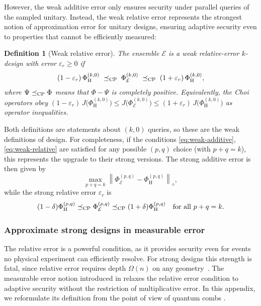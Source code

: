 \documentclass[
    aps,
    superscriptaddress,
    onecolumn,
    10pt,
    prx,
    nofootinbib
]{revtex4-2}
\newtheorem{definition}{Definition}
\newcommand{\Haar}{\mathrm H}
\newcommand{\cE}{\mathcal E}
\theoremstyle{namedstatement}
\theoremstyle{plain}
\begin{document}
However, the weak additive error only ensures security under parallel queries of the sampled unitary. Instead, the weak relative error represents the strongest notion of approximation error for unitary designs, ensuring adaptive security even to properties that cannot be efficiently measured:
 
\begin{definition}[Weak relative error]\label{def:weak-relative-error}
The ensemble \(\cE\) is a \emph{weak relative-error \(k\)-design} with error \(\varepsilon_r\geq0\) if
\begin{equation}\label{eq:weak-relative}
 (1-\varepsilon_r)\,\Phi_{\Haar}^{(k,0)}
 \;\preceq_{\rm CP}\;
 \Phi_{\cE}^{(k,0)}
 \;\preceq_{\rm CP}\;
 (1+\varepsilon_r)\,\Phi_{\Haar}^{(k,0)},
\end{equation}
where \(\Psi\preceq_{\rm CP}\Phi\) means that \(\Phi-\Psi\) is completely positive.  Equivalently, the Choi operators obey
\((1-\varepsilon_r)\,J\bigl(\Phi_{\Haar}^{(k,0)}\bigr)\leq J\bigl(\Phi_{\cE}^{(k,0)}\bigr)\leq(1+\varepsilon_r)\,J\bigl(\Phi_{\Haar}^{(k,0)}\bigr)\)
as operator inequalities.
\end{definition}
Both definitions are statements about $(k,0)$ queries, so these are the weak definitions of design. For completeness, if the conditions \cref{eq:weak-additive}, \cref{eq:weak-relative} are satisfied for any possible $(p,q)$ choice (with $p+q=k$), this represents the upgrade to their strong versions. The strong additive error is then given by
\begin{equation}
 \max_{p+q=k}\left\|\Phi_{\cE}^{(p,q)}-\Phi_{\Haar}^{(p,q)}\right\|_\diamond,
\end{equation}
while the strong relative error \(\varepsilon_r\) is
\begin{equation}
 (1-\delta)\Phi_{\Haar}^{(p,q)}\preceq_{\rm CP}
 \Phi_{\cE}^{(p,q)}\preceq_{\rm CP}
 (1+\delta)\Phi_{\Haar}^{(p,q)}
 \quad\text{for all }p+q=k.
\end{equation}


\subsubsection{Approximate strong designs in measurable error}
The relative error is a powerful condition, as it provides security even for events no physical experiment can efficiently resolve. For strong designs this strength is fatal, since relative error requires depth $\Omega(n)$ on any geometry~\cite{SchusterEtAlStrong2025}. The measurable error notion introduced in \cite{cui2025unitarydesignsnearlyoptimal} relaxes the relative error condition to adaptive security without the restriction of multiplicative error. In this appendix, we reformulate its definition from the point of view of quantum combs \cite{ChiribellaEtAl2009}.
\end{document}
